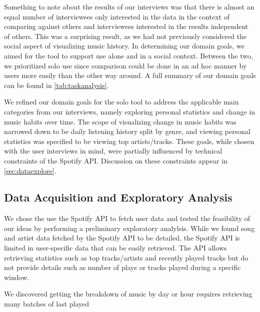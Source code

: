 \documentclass[journal]{vgtc}                %
\begin{document}


Something to note about the results of our interviews was that there is almost an equal number of interviewees only interested in the data in the context of comparing against others and interviewees interested in the results independent of others. This was a surprising result, as we had not previously considered the social aspect of visualizing music history. In determining our domain goals, we aimed for the tool to support use alone and in a social context. Between the two, we prioritized solo use since comparison could be done in an ad hoc manner by users more easily than the other way around. 
A full summary of our domain goals can be found in \autoref{tab:taskanalysis}.



We refined our domain goals for the solo tool to address the applicable main categories from our interviews, namely exploring personal statistics and change in music habits over time. The scope of visualizing change in music habits was narrowed down to be daily listening history split by genre, and viewing personal statistics was specified to be viewing top artists/tracks. These goals, while chosen with the user interviews in mind, were partially influenced by technical constraints of the Spotify API. Discussion on these constraints appear in \autoref{sec:dataexplore}.


\subsection{Data Acquisition and Exploratory Analysis}\label{sec:dataexplore}

We chose the use the Spotify API to fetch user data and tested the feasibility of our ideas by performing a preliminary exploratory analylsis. 
While we found song and artist data fetched by the Spotify API to be detailed, the Spotify API is limited in user-specific data that can be easily retrieved. The API allows retrieving statistics such as top tracks/artists and recently played tracks but do not provide details such as number of plays or tracks played during a specific window. 

We discovered getting the breakdown of music by day or hour requires retrieving many batches of last played
\end{document}

